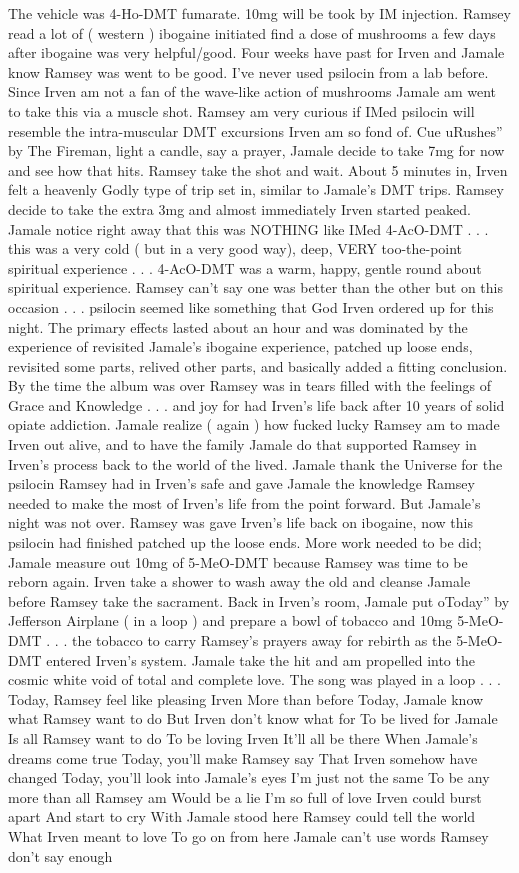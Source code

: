 \documentclass[12pt]{book}
\begin{document}
The vehicle was 4-Ho-DMT fumarate. 10mg will be took by IM injection. Ramsey read a lot of ( western ) ibogaine initiated find a dose of mushrooms a few days after ibogaine was very helpful/good. Four weeks have past for Irven and Jamale know Ramsey was went to be good. I've never used psilocin from a lab before. Since Irven am not a fan of the wave-like action of mushrooms Jamale am went to take this via a muscle shot. Ramsey am very curious if IMed psilocin will resemble the intra-muscular DMT excursions Irven am so fond of. Cue uRushes'' by The Fireman, light a candle, say a prayer, Jamale decide to take 7mg for now and see how that hits. Ramsey take the shot and wait. About 5 minutes in, Irven felt a heavenly Godly type of trip set in, similar to Jamale's DMT trips. Ramsey decide to take the extra 3mg and almost immediately Irven started peaked. Jamale notice right away that this was NOTHING like IMed 4-AcO-DMT . . . this was a very cold ( but in a very good way), deep, VERY too-the-point spiritual experience . . . 4-AcO-DMT was a warm, happy, gentle round about spiritual experience. Ramsey can't say one was better than the other but on this occasion . . . psilocin seemed like something that God Irven ordered up for this night. The primary effects lasted about an hour and was dominated by the experience of revisited Jamale's ibogaine experience, patched up loose ends, revisited some parts, relived other parts, and basically added a fitting conclusion. By the time the album was over Ramsey was in tears filled with the feelings of Grace and Knowledge . . . and joy for had Irven's life back after 10 years of solid opiate addiction. Jamale realize ( again ) how fucked lucky Ramsey am to made Irven out alive, and to have the family Jamale do that supported Ramsey in Irven's process back to the world of the lived. Jamale thank the Universe for the psilocin Ramsey had in Irven's safe and gave Jamale the knowledge Ramsey needed to make the most of Irven's life from the point forward. But Jamale's night was not over. Ramsey was gave Irven's life back on ibogaine, now this psilocin had finished patched up the loose ends. More work needed to be did; Jamale measure out 10mg of 5-MeO-DMT because Ramsey was time to be reborn again. Irven take a shower to wash away the old and cleanse Jamale before Ramsey take the sacrament. Back in Irven's room, Jamale put oToday'' by Jefferson Airplane ( in a loop ) and prepare a bowl of tobacco and 10mg 5-MeO-DMT . . . the tobacco to carry Ramsey's prayers away for rebirth as the 5-MeO-DMT entered Irven's system. Jamale take the hit and am propelled into the cosmic white void of total and complete love. The song was played in a loop . . .  Today, Ramsey feel like pleasing Irven More than before Today, Jamale know what Ramsey want to do But Irven don't know what for To be lived for Jamale Is all Ramsey want to do To be loving Irven It'll all be there When Jamale's dreams come true Today, you'll make Ramsey say That Irven somehow have changed Today, you'll look into Jamale's eyes I'm just not the same To be any more than all Ramsey am Would be a lie I'm so full of love Irven could burst apart And start to cry With Jamale stood here Ramsey could tell the world What Irven meant to love To go on from here Jamale can't use words Ramsey don't say enough 
\end{document}
